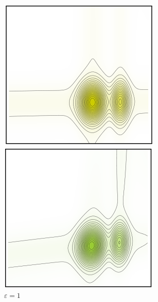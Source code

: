 \documentclass[cn,10pt,math=newtx,citestyle=gb7714-2015,bibstyle=gb7714-2015]{elegantbook}
\begin{document}
\begin{figure}[H]
	\centering
	\begin{minipage}{0.8\linewidth}
	\centering
	\begin{minipage}{0.19\linewidth}
		\centering
		    \includegraphics[width=\linewidth]{figure/fig4.6/1.png}
		\caption*{$\varepsilon=1$}
	\end{minipage}
	\begin{minipage}{0.19\linewidth}
		\centering
		    \includegraphics[width=\linewidth]{figure/fig4.6/2.png}

\end{minipage}
\end{minipage}
\end{figure}
\end{document}
